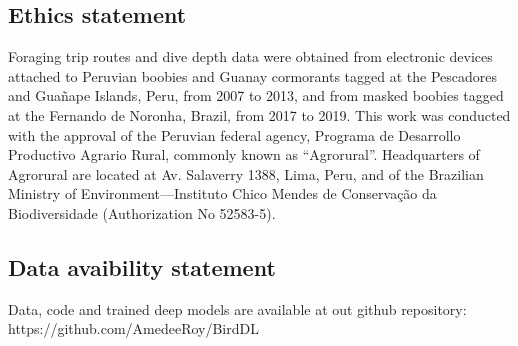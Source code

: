 \documentclass{article}
\begin{document}
\subsection*{Ethics statement}
Foraging trip routes and dive depth data were obtained from electronic devices attached to Peruvian boobies and Guanay cormorants tagged at the Pescadores and Guañape Islands, Peru, from 2007 to 2013, and from masked boobies tagged at the Fernando de Noronha, Brazil, from 2017 to 2019. This work was conducted with the approval of the Peruvian federal agency, Programa de Desarrollo Productivo Agrario Rural, commonly known as “Agrorural”. Headquarters of Agrorural are located at Av. Salaverry 1388, Lima, Peru, and of the Brazilian Ministry of Environment—Instituto Chico Mendes de Conservação da Biodiversidade (Authorization No 52583-5).

\subsection*{Data avaibility statement}
Data, code and trained deep models are available at out github repository: https://github.com/AmedeeRoy/BirdDL


\printbibliography

\newpage
\end{document}
